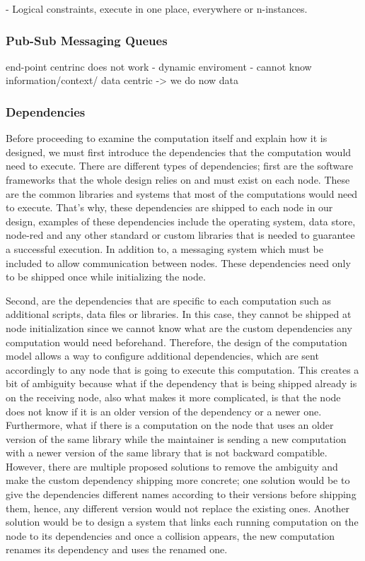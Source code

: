 - Logical constraints, execute in one place, everywhere or n-instances.


\subsubsection{Pub-Sub Messaging Queues}
end-point centrinc does not work - dynamic enviroment - cannot know information/context/ data centric -> we do now data
\newpage


\subsubsection{Dependencies}

Before proceeding to examine the computation itself and explain how it is designed, we must first introduce the dependencies that the computation would need to execute. There are different types of dependencies; first are the software frameworks that the whole design relies on and must exist on each node. These are the common libraries and systems that most of the computations would need to execute. That's why, these dependencies are shipped to each node in our design, examples of these dependencies include the operating system, data store, node-red and any other standard or custom libraries that is needed to guarantee a successful execution. In addition to, a messaging system which must be included to allow communication between nodes. These dependencies need only to be shipped once while initializing the node.

 Second, are the dependencies that are specific to each computation such as additional scripts, data files or libraries. In this case, they cannot be shipped at node initialization since we cannot know what are the custom dependencies any computation would need beforehand. Therefore, the design of the computation model allows a way to configure additional dependencies, which are sent accordingly to any node that is going to execute this computation.
  This creates a bit of ambiguity because what if the dependency that is being shipped  already is on the receiving node, also what makes it more complicated, is that the node does not know if it is an older version of the dependency or a newer one. Furthermore, what if there is a computation on the node that uses an older version of the same library while the maintainer is sending a new computation with a newer version of the same library that is not backward compatible. However, there are multiple proposed solutions to remove the ambiguity and make the custom dependency shipping more concrete; one solution would be to give the dependencies different names according to their versions before shipping them, hence, any different version would not replace the existing ones. Another solution would be to design a system that links each running computation on the node to its dependencies and once a collision appears, the new computation renames its dependency and uses the renamed one.
 

